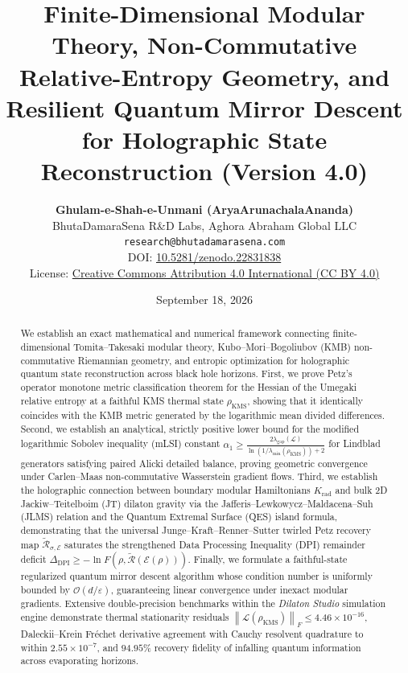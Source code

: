 \documentclass[11pt,a4paper]{article}
\title{\textbf{Finite-Dimensional Modular Theory, Non-Commutative Relative-Entropy Geometry, and Resilient Quantum Mirror Descent for Holographic State Reconstruction (Version 4.0)}}
\author{
    \textbf{Ghulam-e-Shah-e-Unmani (AryaArunachalaAnanda)}\\
    \small BhutaDamaraSena R\&D Labs, Aghora Abraham Global LLC\\
    \small \texttt{research@bhutadamarasena.com} \\
    \small DOI: \href{https://doi.org/10.5281/zenodo.22831838}{10.5281/zenodo.22831838} \\
    \small License: \href{https://creativecommons.org/licenses/by/4.0/}{Creative Commons Attribution 4.0 International (CC BY 4.0)}
}
\date{September 18, 2026}
\theoremstyle{plain}
\theoremstyle{definition}
\newcommand{\KMS}{\mathrm{KMS}}
\newcommand{\norm}[1]{\left\lVert #1 \right\rVert}
\begin{document}
\sloppy

\maketitle

\begin{abstract}
We establish an exact mathematical and numerical framework connecting finite-dimensional Tomita--Takesaki modular theory, Kubo--Mori--Bogoliubov (KMB) non-commutative Riemannian geometry, and entropic optimization for holographic quantum state reconstruction across black hole horizons. First, we prove Petz's operator monotone metric classification theorem for the Hessian of the Umegaki relative entropy at a faithful KMS thermal state $\rho_{\KMS}$, showing that it identically coincides with the KMB metric generated by the logarithmic mean divided differences. Second, we establish an analytical, strictly positive lower bound for the modified logarithmic Sobolev inequality (mLSI) constant $\alpha_1 \ge \frac{2\lambda_{\mathrm{gap}}(\mathcal{L})}{\ln(1/\lambda_{\min}(\rho_{\KMS})) + 2}$ for Lindblad generators satisfying paired Alicki detailed balance, proving geometric convergence under Carlen--Maas non-commutative Wasserstein gradient flows. Third, we establish the holographic connection between boundary modular Hamiltonians $K_{\mathrm{rad}}$ and bulk 2D Jackiw--Teitelboim (JT) dilaton gravity via the Jafferis--Lewkowycz--Maldacena--Suh (JLMS) relation and the Quantum Extremal Surface (QES) island formula, demonstrating that the universal Junge--Kraft--Renner--Sutter twirled Petz recovery map $\widetilde{\mathcal{R}}_{\sigma, \mathcal{E}}$ saturates the strengthened Data Processing Inequality (DPI) remainder deficit $\Delta_{\mathrm{DPI}} \ge -\ln F(\rho, \widetilde{\mathcal{R}}(\mathcal{E}(\rho)))$. Finally, we formulate a faithful-state regularized quantum mirror descent algorithm whose condition number is uniformly bounded by $\mathcal{O}(d/\varepsilon)$, guaranteeing linear convergence under inexact modular gradients. Extensive double-precision benchmarks within the \textit{Dilaton Studio} simulation engine demonstrate thermal stationarity residuals $\norm{\mathcal{L}(\rho_{\KMS})}_F \le 4.46 \times 10^{-16}$, Daleckii--Krein Fr\'{e}chet derivative agreement with Cauchy resolvent quadrature to within $2.55 \times 10^{-7}$, and $94.95\%$ recovery fidelity of infalling quantum information across evaporating horizons.
\end{abstract}

\newpage
\tableofcontents
\newpage
\end{document}
